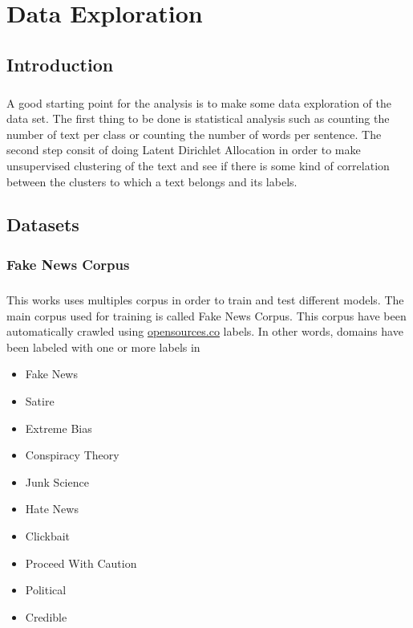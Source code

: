 

\chapter{Data Exploration} \label{chap2}
\section{Introduction}
\paragraph{}
A good starting point for the analysis is to make some data exploration of the data set. The first thing to be done is statistical analysis such as counting the number of text per class or counting the number of words per sentence. The second step consit of doing Latent Dirichlet Allocation\cite{blei2003latent} in order to make unsupervised clustering of the text and see if there is some kind of correlation between the clusters to which a text belongs and its labels. 

\section{Datasets} \label{intro:dataset}
\subsection{Fake News Corpus}
\paragraph{}
This works uses multiples corpus in order to train and test different models. The main corpus used for training is called Fake News Corpus\cite{Szpakowski}. This corpus have been automatically crawled using \url{opensources.co} labels. In other words, domains have been labeled with one or more labels in \begin{itemize}
  \item Fake News
  \item Satire
  \item Extreme Bias
  \item Conspiracy Theory
  \item Junk Science
  \item Hate News
  \item Clickbait
  \item Proceed With Caution
  \item Political
  \item Credible
\end{itemize}
